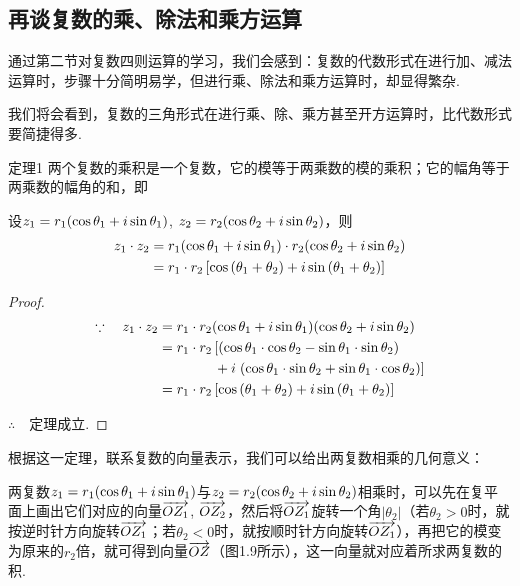 \subsection{再谈复数的乘、除法和乘方运算}
通过第二节对复数四则运算的学习，我们会感到：复数的代数形式在进行加、减法运算时，步骤十分简明易学，但进行乘、除法和乘方运算时，却显得繁杂.

我们将会看到，复数的三角形式在进行乘、除、乘方甚至开方运算时，比代数形式要简捷得多.

\begin{blk}
 {定理1} 两个复数的乘积是一个复数，它的模等于两乘数的模的乘积；它的幅角等于两乘数的幅角的和，即   

设$z_1=r_1(\cos{\theta_1}+i\sin{\theta_1})$, $z_2=r_2(\cos{\theta_2}+i\sin{\theta_2})$，则
\[\begin{split}
z_1\cdot z_2 &=r_1(\cos{\theta_1}+i\sin{\theta_1})\cdot r_2(\cos{\theta_2}+i\sin{\theta_2})\\
&=r_1\cdot r_2 \left[\cos\left(\theta_1+\theta_2\right)+i\sin\left(\theta_1+\theta_2\right)\right]
\end{split}\]
\end{blk}

\begin{proof}
\[\begin{split}
    \because\quad z_1\cdot z_2&=r_1\cdot r_2(\cos{\theta_1}+i\sin{\theta_1})(\cos{\theta_2}+i\sin{\theta_2})\\
&=r_1\cdot r_2 \left[\left(\cos\theta_1\cdot \cos\theta_2-\sin\theta_1\cdot \sin\theta_2\right)\right.\\
&\qquad \qquad +i\left.\left(\cos\theta_1\cdot \sin\theta_2+\sin\theta_1\cdot \cos\theta_2\right)\right]\\
&=r_1\cdot r_2 \left[\cos\left(\theta_1+\theta_2\right)+i\sin\left(\theta_1+\theta_2\right)\right]
\end{split}\]

$\therefore\quad $定理成立.
\end{proof}

根据这一定理，联系复数的向量表示，我们可以给出两复数相乘的几何意义：

两复数$z_1=r_1(\cos{\theta_1}+i\sin{\theta_1})$与$z_2=r_2(\cos{\theta_2}+i\sin{\theta_2})$相乘时，可以先在复平
面上画出它们对应的向量$\overrightarrow{OZ_1}$, $\overrightarrow{OZ_2}$，然后将$\overrightarrow{OZ_1}$旋转一个角$|\theta_2|$（若$\theta_2>0$时，就按逆时针方向旋转$\overrightarrow{OZ_1}$；若$\theta_2<0$时，就按顺时针方向旋转$\overrightarrow{OZ_1}$），再把它的模变为原来的$r_2$倍，就可得到向量$\overrightarrow{OZ}$（图1.9所示），这一向量就对应着所求两复数的积.

\begin{figure}[htp]
    \centering
{}
    \caption{}
\end{figure}



